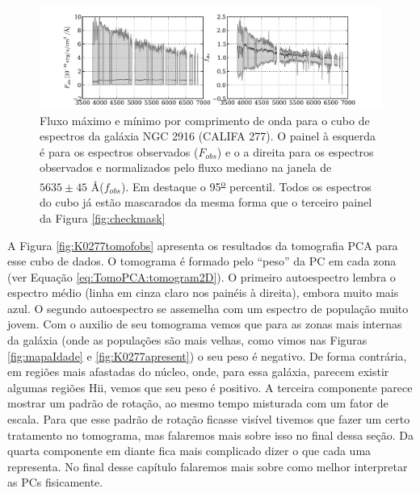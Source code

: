 \begin{figure}
	\includegraphics[width=1.\textwidth]{figuras/K0277-exampleSpectraFill.pdf}
    \caption[Máximo e mínimo de fluxo dos espectros da gal\'axia NGC 2916 (CALIFA 277).] 
    {Fluxo máximo e mínimo por comprimento de onda para o cubo de espectros da galáxia NGC 2916 (CALIFA 277). O painel à
    esquerda é para os espectros observados ($F_{obs}$) e o a direita para os espectros observados e normalizados pelo
    fluxo mediano na janela de $5635 \pm 45$ \AA ($f_{obs}$). Em destaque o 95\textsuperscript{\underline{o}} percentil.
    Todos os espectros do cubo já estão mascarados da mesma forma que o terceiro painel da Figura \ref{fig:checkmask}}
    \label{fig:K0277ExampleSpectraFill}
\end{figure}

A Figura \ref{fig:K0277tomofobs} apresenta os resultados da tomografia PCA para esse cubo de dados. O tomograma é
formado pelo ``peso'' da PC em cada zona (ver Equação \ref{eq:TomoPCA:tomogram2D}). O primeiro autoespectro lembra o
espectro médio (linha em cinza claro nos painéis à direita), embora muito mais azul. O segundo autoespectro se assemelha
com um espectro de população muito jovem. Com o auxilio de seu tomograma vemos que para as zonas mais internas da
galáxia (onde as populações são mais velhas, como vimos nas Figuras \ref{fig:mapaIdade} e \ref{fig:K0277apresent}) o seu
peso é negativo. De forma contrária, em regiões mais afastadas do núcleo, onde, para essa galáxia, parecem existir
algumas regiões H{\sc ii}, vemos que seu peso é positivo. A terceira componente parece mostrar um padrão de rotação, ao
mesmo tempo misturada com um fator de escala. Para que esse padrão de rotação ficasse visível tivemos que fazer um certo
tratamento no tomograma, mas falaremos mais sobre isso no final dessa seção. Da quarta componente em diante fica mais
complicado dizer o que cada uma representa. No final desse capítulo falaremos mais sobre como melhor interpretar as PCs
fisicamente.

